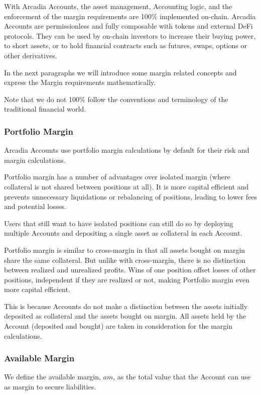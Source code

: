 \documentclass[sigconf,nonacm]{acmart}
\begin{document}
With Arcadia Accounts, the asset management, Accounting logic, and the enforcement of the margin requirements are 100\% implemented on-chain.
Arcadia Accounts are permissionless and fully composable with tokens and external DeFi protocols.
They can be used by on-chain investors to increase their buying power, to short assets, or to hold financial contracts such as futures, swaps, options or other derivatives.

In the next paragraphs we will introduce some margin related concepts and express the Margin requirements mathematically.

Note that we do not 100\% follow the conventions and terminology of the traditional financial world.

\subsubsection{Portfolio Margin}
Arcadia Accounts use portfolio margin calculations by default for their risk and margin calculations.

Portfolio margin has a number of advantages over isolated margin (where collateral is not shared between positions at all).
It is more capital efficient and prevents unnecessary liquidations or rebalancing of positions, leading to lower fees and potential losses.

Users that still want to have isolated positions can still do so by deploying multiple Accounts and depositing a single asset as collateral in each Account.

Portfolio margin is similar to cross-margin in that all assets bought on margin share the same collateral.
But unlike with cross-margin, there is no distinction between realized and unrealized profits.
Wins of one position offset losses of other positions, independent if they are realized or not,
making Portfolio margin even more capital efficient.

This is because Accounts do not make a distinction between the assets initially deposited as collateral and the assets bought on margin.
All assets held by the Account (deposited and bought) are taken in consideration for the margin calculations.

\subsubsection{Available Margin}
\label{subsubsec:available-margin}
We define the available margin, $am$, as the total value that the Account can use as margin to secure liabilities.
\end{document}
